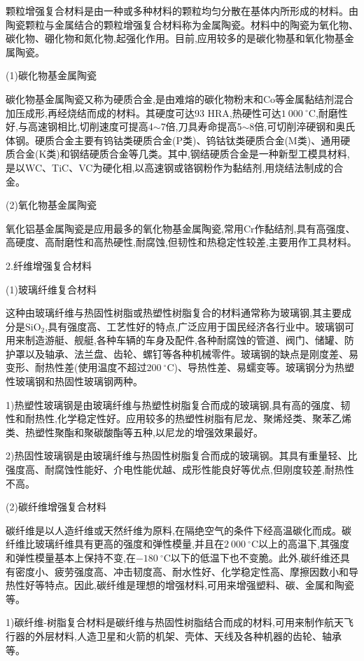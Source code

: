 \documentclass[UTF8]{ctexbook}
\newcommand{\◎}{\ensuremath{\bigcirc}}
\begin{document}
颗粒增强复合材料是由一种或多种材料的颗粒均匀分散在基体内所形成的材料。由陶瓷颗粒与金属结合的颗粒增强复合材料称为金属陶瓷。材料中的陶瓷为氧化物、碳化物、硼化物和氮化物,起强化作用。目前,应用较多的是碳化物基和氧化物基金属陶瓷。

(1)碳化物基金属陶瓷

碳化物基金属陶瓷又称为硬质合金,是由难熔的碳化物粉末和Co等金属黏结剂混合加压成形,再经烧结而成的材料。其硬度可达93 HRA,热硬性可达$1~000~^\circ\mathrm{C}$,耐磨性好,与高速钢相比,切削速度可提高4$\sim$7倍,刀具寿命提高5$\sim$8倍,可切削淬硬钢和奥氏体钢。硬质合金主要有钨钴类硬质合金(P类)、钨钴钛类硬质合金(M类)、通用硬质合金(K类)和钢结硬质合金等几类。其中,钢结硬质合金是一种新型工模具材料,是以WC、TiC、VC为硬化相,以高速钢或铬钢粉作为黏结剂,用烧结法制成的合金。

(2)氧化物基金属陶瓷

氧化铝基金属陶瓷是应用最多的氧化物基金属陶瓷,常用Cr作黏结剂,具有高强度、高硬度、高耐磨性和高热硬性,耐腐蚀,但韧性和热稳定性较差,主要用作工具材料。

2.纤维增强复合材料

(1)玻璃纤维复合材料

这种由玻璃纤维与热固性树脂或热塑性树脂复合的材料通常称为玻璃钢,其主要成分是$\mathrm{SiO_2}$,具有强度高、工艺性好的特点,广泛应用于国民经济各行业中。玻璃钢可用来制造游艇、舰艇,各种车辆的车身及配件,各种耐腐蚀的管道、阀门、储罐、防护罩以及轴承、法兰盘、齿轮、螺钉等各种机械零件。玻璃钢的缺点是刚度差、易变形、耐热性差(使用温度不超过$200~^\circ\mathrm{C}$)、导热性差、易蠕变等。玻璃钢分为热塑性玻璃钢和热固性玻璃钢两种。

1)热塑性玻璃钢是由玻璃纤维与热塑性树脂复合而成的玻璃钢,具有高的强度、韧性和耐热性,化学稳定性好。应用较多的热塑性树脂有尼龙、聚烯烃类、聚苯乙烯类、热塑性聚酯和聚碳酸酯等五种,以尼龙的增强效果最好。

2)热固性玻璃钢是由玻璃纤维与热固性树脂复合而成的玻璃钢。其具有重量轻、比强度高、耐腐蚀性能好、介电性能优越、成形性能良好等优点,但刚度较差,耐热性不高。

(2)碳纤维增强复合材料

碳纤维是以人造纤维或天然纤维为原料,在隔绝空气的条件下经高温碳化而成。碳纤维比玻璃纤维具有更高的强度和弹性模量,并且在$2~000~^\circ\mathrm{C}$以上的高温下,其强度和弹性模量基本上保持不变,在$-180~^\circ\mathrm{C}$以下的低温下也不变脆。此外,碳纤维还具有密度小、疲劳强度高、冲击韧度高、耐水性好、化学稳定性高、摩擦因数小和导热性好等特点。因此,碳纤维是理想的增强材料,可用来增强塑料、碳、金属和陶瓷等。

1)碳纤维-树脂复合材料是碳纤维与热固性树脂结合而成的材料,可用来制作航天飞行器的外层材料,人造卫星和火箭的机架、壳体、天线及各种机器的齿轮、轴承等。
\end{document}
